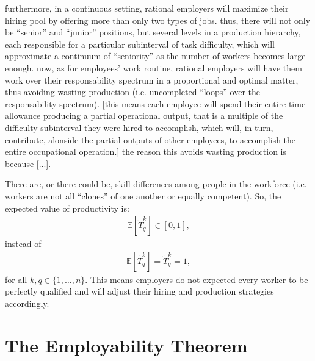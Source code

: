 \documentclass[hidelinks, nonatbib]{elsarticle}
\begin{document}
furthermore, in a continuous setting, rational employers will maximize their hiring pool by offering more than only two types of jobs. thus, there will not only be ``senior'' and ``junior'' positions, but several levels in a production hierarchy, each responsible for a particular subinterval of task difficulty, which will approximate a continuum of ``seniority'' as the number of workers becomes large enough.
now, as for employees' work routine, rational employers will have them work over their responsability spectrum in a proportional and optimal matter, thus avoiding wasting production (i.e. uncompleted ``loops'' over the responsability spectrum). [this means each employee will spend their entire time allowance producing a partial operational output, that is a multiple of the difficulty subinterval they were hired to accomplish, which will, in turn, contribute, alonside the partial outputs of other employees, to accomplish the entire occupational operation.]
the reason this avoids wasting production is because [...].

\begin{axiom}
    There are, or there could be, skill differences among people in the workforce (i.e. workers are not all ``clones'' of one another or equally competent). So, the expected value of productivity is:
    \begin{gather}
        \mathbb{E}[
            \tilde{T}_{q}^{k}
        ]
        \in
        [0,1]
        ,
    \end{gather}
    instead of 
    \begin{gather}
        \mathbb{E}[
            \tilde{T}_{q}^{k}
        ]
        =
        \tilde{T}_{q}^{k}
        = 1
        ,
    \end{gather}
    for all $k,q \in \{1, \dots, n\}$. This means employers do not expected every worker to be perfectly qualified and will adjust their hiring and production strategies accordingly.
\end{axiom}


\section{The Employability Theorem}
\end{document}
